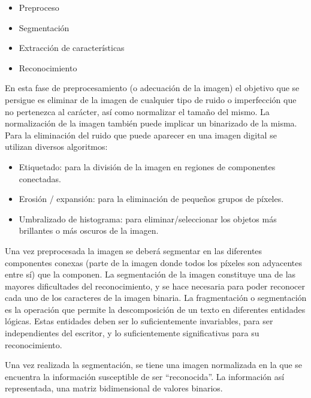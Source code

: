 \begin{itemize}
\item Preproceso 
\item Segmentación 
\item Extracción de características 
\item Reconocimiento 
\end{itemize}



En esta fase de preprocesamiento (o adecuación de la imagen) el objetivo que se persigue es eliminar de la imagen de cualquier 
tipo de ruido o imperfección que no pertenezca al carácter, así como normalizar el tamaño del mismo. La normalización de la imagen también puede implicar un binarizado de la misma. Para la eliminación del ruido que puede aparecer en una imagen digital se utilizan diversos algoritmos:
\begin{itemize}
\item Etiquetado:  para  la  división  de  la  imagen  en  regiones  de componentes conectadas. 
\item Erosión / expansión: para la eliminación de peque\~nos grupos de píxeles. 
\item Umbralizado de histograma:  para  eliminar/seleccionar los objetos más brillantes o más oscuros de la imagen.  
\end{itemize}



Una vez preprocesada la imagen se deberá segmentar en las diferentes componentes conexas (parte de la imagen donde todos los píxeles son adyacentes entre sí) que la componen. La segmentación de la imagen constituye una de las mayores dificultades del reconocimiento, y se hace  necesaria para poder reconocer cada uno de los caracteres de la imagen binaria.
La fragmentación o segmentación es la operación que permite la descomposición  de  un  texto  en  diferentes  entidades lógicas. Estas entidades deben ser lo suficientemente invariables, para ser independientes del escritor, y lo suficientemente significativas para su reconocimiento.  



Una  vez  realizada  la  segmentación,  se  tiene  una  imagen normalizada en la que se encuentra la información susceptible de ser “reconocida”. La información así representada, una matriz bidimensional de valores binarios.

